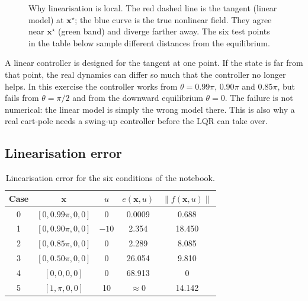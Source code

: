 \documentclass[11pt]{article}
\newcommand{\x}{\mathbf{x}}
\begin{document}
\begin{figure}[htbp]
\centering
{}
\caption{Why linearisation is local.  The red dashed line is the tangent
(linear model) at $\x^\star$; the blue curve is the true nonlinear field.
They agree near $\x^\star$ (green band) and diverge farther away.  The six
test points in the table below sample different distances from the
equilibrium.}
\label{fig:linearization_local}
\end{figure}

\begin{pitfall}[breakable=false,title={Do not use a linear controller everywhere}]
A linear controller is designed for the tangent at one point.  If the state
is far from that point, the real dynamics can differ so much that the
controller no longer helps.  In this exercise the controller works from
$\theta=0.99\pi$, $0.90\pi$ and $0.85\pi$, but fails from $\theta=\pi/2$ and
from the downward equilibrium $\theta=0$.  The failure is not numerical: the
linear model is simply the wrong model there.  This is also why a real
cart-pole needs a swing-up controller before the LQR can take over.
\end{pitfall}

\subsection{Linearisation error}

\begin{table}[htbp]
\centering
\caption{Linearisation error for the six conditions of the notebook.}
\begin{tabular}{ccccc}
\toprule
Case & $\x$ & $u$ & $e(\x,u)$ & $\|f(\x,u)\|$ \\
\midrule
0 & $[0,0.99\pi,0,0]$ & 0 & 0.0009 & 0.688 \\
1 & $[0,0.90\pi,0,0]$ & $-10$ & 2.354 & 18.450 \\
2 & $[0,0.85\pi,0,0]$ & 0 & 2.289 & 8.085 \\
3 & $[0,0.50\pi,0,0]$ & 0 & 26.054 & 9.810 \\
4 & $[0,0,0,0]$ & 0 & 68.913 & 0 \\
5 & $[1,\pi,0,0]$ & 10 & $\approx0$ & 14.142 \\
\bottomrule
\end{tabular}
\end{table}
\end{document}
